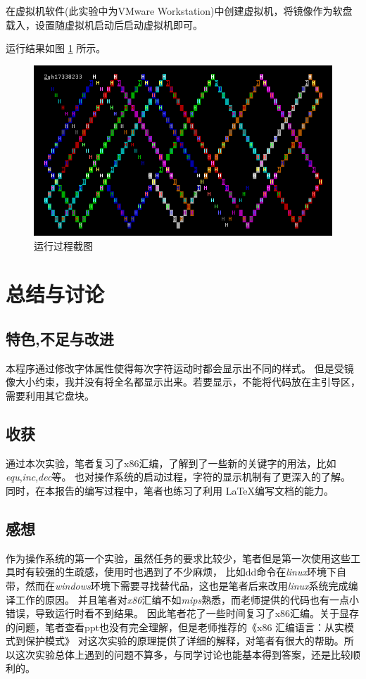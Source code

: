 \documentclass[a4paper, 11pt]{article} %
\begin{document}
在虚拟机软件(此实验中为VMware Workstation)中创建虚拟机，将镜像作为软盘载入，设置随虚拟机启动后启动虚拟机即可。

运行结果如图 \ref{fig:run} 所示。

\begin{figure}[H]
  \centering
   \includegraphics[width=0.8\linewidth]{run.png}
  \caption{运行过程截图}
  \label{fig:run}
\end{figure}

\section{总结与讨论}



\subsection{特色,不足与改进}

本程序通过修改字体属性使得每次字符运动时都会显示出不同的样式。
但是受镜像大小约束，我并没有将全名都显示出来。若要显示，不能将代码放在主引导区，需要利用其它盘块。

\subsection{收获}

通过本次实验，笔者复习了x86汇编，了解到了一些新的关键字的用法，比如\textit{equ},\textit{inc},\textit{dec}等。
也对操作系统的启动过程，字符的显示机制有了更深入的了解。同时，在本报告的编写过程中，笔者也练习了利用 \LaTeX 编写文档的能力。\cite{lamport94, cite}

\subsection{感想}

作为操作系统的第一个实验，虽然任务的要求比较少，笔者但是第一次使用这些工具时有较强的生疏感，使用时也遇到了不少麻烦，
比如dd命令在\textit{linux}环境下自带，然而在\textit{windows}环境下需要寻找替代品，这也是笔者后来改用\textit{linux}系统完成编译工作的原因。
并且笔者对\textit{x86}汇编不如\textit{mips}熟悉，而老师提供的代码也有一点小错误，导致运行时看不到结果。
因此笔者花了一些时间复习了x86汇编。关于显存的问题，笔者查看ppt也没有完全理解，但是老师推荐的《x86 汇编语言：从实模式到保护模式》
对这次实验的原理提供了详细的解释，对笔者有很大的帮助。所以这次实验总体上遇到的问题不算多，与同学讨论也能基本得到答案，还是比较顺利的。
\end{document}
